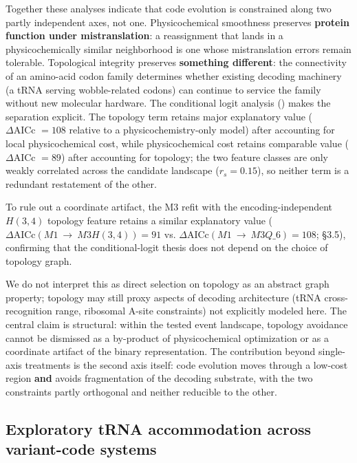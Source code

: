 \documentclass[preprint,11pt,authoryear,a4paper]{elsarticle}
\begin{document}
Together these analyses indicate that code evolution is constrained
along two partly independent axes, not one. Physicochemical smoothness
preserves \textbf{protein function under mistranslation}: a reassignment
that lands in a physicochemically similar neighborhood is one whose
mistranslation errors remain tolerable. Topological integrity preserves
\textbf{something different}: the connectivity of an amino-acid codon
family determines whether existing decoding machinery (a tRNA serving
wobble-related codons) can continue to service the family without new
molecular hardware. The conditional logit analysis
() makes the separation explicit. The topology term
retains major explanatory value (\(\Delta\text{AICc } = 108\) relative
to a physicochemistry-only model) after accounting for local
physicochemical cost, while physicochemical cost retains comparable
value (\(\Delta\text{AICc } = 89\)) after accounting for topology; the
two feature classes are only weakly correlated across the candidate
landscape (\(r_{s} = 0.15\)), so neither term is a redundant restatement
of the other.

To rule out a coordinate artifact, the M3 refit with the
encoding-independent \(H(3,4)\) topology feature retains a similar
explanatory value
(\(\Delta\text{AICc}\left( M1\  \rightarrow \ M3{H(3,4)} \right) = 91\)
vs. \(\Delta\text{AICc}(M1\  \rightarrow \ M3Q\_ 6) = 108\); §3.5),
confirming that the conditional-logit thesis does not depend on the
choice of topology graph.

We do not interpret this as direct selection on topology as an abstract
graph property; topology may still proxy aspects of decoding
architecture (tRNA cross-recognition range, ribosomal A-site
constraints) not explicitly modeled here. The central claim is
structural: within the tested event landscape, topology avoidance cannot
be dismissed as a by-product of physicochemical optimization or as a
coordinate artifact of the binary representation. The contribution
beyond single-axis treatments is the second axis itself: code evolution
moves through a low-cost region \textbf{and} avoids fragmentation of the
decoding substrate, with the two constraints partly orthogonal and
neither reducible to the other.

\subsection{Exploratory tRNA accommodation across variant-code
systems}\label{sec:disc-trna}
\end{document}
